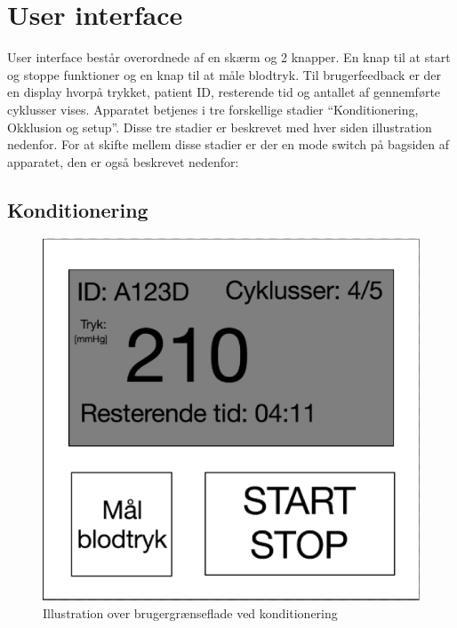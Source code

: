 \chapter{User interface}
User interface består overordnede af en skærm og 2 knapper. En knap til at start og stoppe funktioner og en knap til at måle blodtryk. Til brugerfeedback er der en display hvorpå trykket, patient ID, resterende tid og antallet af gennemførte cyklusser vises. Apparatet betjenes i tre forskellige stadier “Konditionering, Okklusion og setup”. Disse tre stadier er beskrevet med hver siden illustration nedenfor. For at skifte mellem disse stadier er der en mode switch på bagsiden af apparatet, den er også beskrevet nedenfor: 

\section{Konditionering}
\begin{figure}[H]
	\includegraphics[width=\textwidth]{Illustrationer/KonditioneringGUI}
	\caption{Illustration over brugergrænseflade ved konditionering}
\end{figure}

